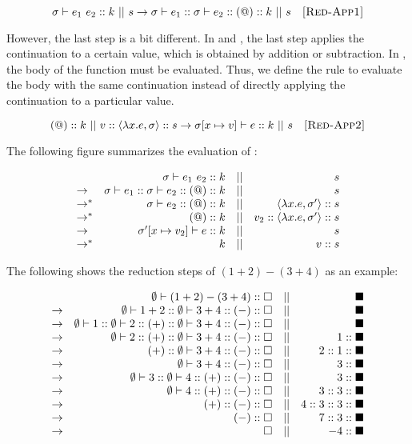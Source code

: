 \[
  \sigma\vdash e_1\ e_2::k\ ||\ s\rightarrow \sigma\vdash e_1::\sigma\vdash e_2::(@):: k\ ||\ s
  \quad\textsc{[Red-App1]}
\]

However, the last step is a bit different. In  and , the
last step applies the continuation to a certain value, which is obtained by
addition or subtraction. In , the body of the function must be
evaluated. Thus, we define the rule to evaluate the body with the same
continuation instead of directly applying the continuation to a particular
value.

\[
  \appk k\ ||\ \conss{v}\conss{\clov{x}{e}{\sigma}}s\rightarrow
  \evalk{\sigma\lbrack x\mapsto v\rbrack}{e}k\ ||\ s
  \quad\textsc{[Red-App2]}
\]

The following figure summarizes the evaluation of :

\[
\begin{array}{lrcr}
  & \sigma\vdash e_1\ e_2::k & || & s \\
  \rightarrow & \sigma\vdash e_1::\sigma\vdash e_2::(@):: k & || & s \\
  \rightarrow^\ast & \sigma\vdash e_2::(@):: k & || & \langle\lambda x.e,\sigma'\rangle::s \\
  \rightarrow^\ast & (@):: k & || & v_2::\langle\lambda x.e,\sigma'\rangle::s \\
  \rightarrow & \sigma'[x\mapsto v_2]\vdash e::k & || & s \\
  \rightarrow^\ast & k & || & v::s
\end{array}
\]

The following shows the reduction steps of $(1+2)-(3+4)$ as an example:

\[
\begin{array}{lrcr}
& \emptyset\vdash(1+2)-(3+4)::\square &||& \blacksquare \\
\rightarrow & \emptyset\vdash1+2::\emptyset\vdash3+4::(-):: \square &||&
\blacksquare \\
\rightarrow &
\emptyset\vdash1::\emptyset\vdash2::(+):: \emptyset\vdash3+4::(-):: \square &||&
\blacksquare \\
\rightarrow & \emptyset\vdash2::(+):: \emptyset\vdash3+4::(-):: \square &||&
1::\blacksquare \\
\rightarrow & (+):: \emptyset\vdash3+4::(-):: \square &||& 2::1::\blacksquare \\
\rightarrow & \emptyset\vdash3+4::(-):: \square &||& 3::\blacksquare \\
\rightarrow & \emptyset\vdash3::\emptyset\vdash4::(+):: (-):: \square &||&
3::\blacksquare \\
\rightarrow & \emptyset\vdash4::(+):: (-):: \square &||& 3::3::\blacksquare \\
\rightarrow & (+):: (-):: \square &||& 4::3::3::\blacksquare \\
\rightarrow & (-):: \square &||& 7::3::\blacksquare \\
\rightarrow & \square &||& -4::\blacksquare \\
\end{array}
\]

